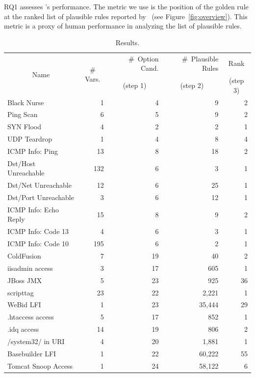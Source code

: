 \documentclass[conference]{IEEEtran}
\begin{document}
RQ1 assesses \tname's performance. The metric we use is the position
of the golden rule at the ranked list of plausible rules reported by
\tname\ (see Figure~\ref{fig:overview}). This metric is a proxy of
human performance in analyzing the list of plausible rules.

\begin{table}[t!]
  \footnotesize
  \setlength{\tabcolsep}{2pt}
  \renewcommand{\arraystretch}{0.5}
  \caption{\label{table:results}Results.}
  \vspace{-2ex}
  \centering
  \begin{tabular}{lrrrr}
    \toprule
    \multicolumn{1}{c}{\multirow{2}{*}{Name}} &
    \multicolumn{1}{c}{\multirow{2}{*}{\# Vars.}} &
    \#~Option Cand. &
    \#~Plausible Rules &    
    \multicolumn{1}{c}{Rank} \\

     &
    \multicolumn{1}{c}{} &
    \multicolumn{1}{c}{(step 1)} &
    \multicolumn{1}{c}{(step 2)} &    
    \multicolumn{1}{c}{(step 3)} \\

    \midrule
    Black Nurse & 1 & 4 & 9 & 2 \\    
    Ping Scan & 6 & 5 & 9 & 2 \\
    SYN Flood & 4 & 2 & 2 & 1 \\
    UDP Teardrop & 1 & 4 & 8 & 4 \\
    ICMP Info: Ping & 13 & 8 & 18 & 2 \\
    Dst/Host Unreachable & 132 & 6 & 3 & 1 \\
    Dst/Net Unreachable & 12 & 6 & 25 & 1 \\
    Dst/Port Unreachable & 3 & 6 & 12 & 1 \\
    ICMP Info: Echo Reply & 15 & 8 & 9 & 2 \\
    ICMP Info: Code 13 & 4 & 6 & 3 & 1 \\
    ICMP Info: Code 10 & 195 & 6 & 2 & 1 \\
    \midrule
    ColdFusion & 7 & 19 & 40 & 2\\
    iisadmin access & 3 & 17 & 605 & 1 \\        
    JBoss JMX & 5 & 23 & 925 & 36 \\
    scripttag & 23 & 22 & 2,221 & 1 \\
    WeBid LFI & 1 & 23 & 35,444 & 29\\    
    .htaccess access & 5 & 17 & 852 & 1\\
    .idq access & 14 & 19 & 806 & 2 \\
    /system32/ in URI & 4 & 20 & 1,881 & 1 \\
    Basebuilder LFI & 1 & 22 & 60,222 & 55 \\
    Tomcat Snoop Access & 1 & 24 & 58,122 & 6 \\
    \bottomrule
  \end{tabular}
\end{table}
\end{document}
